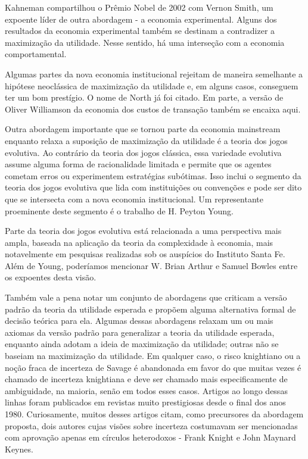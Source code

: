 \documentclass[a4paper,12pt]{article}[abntex2]
\begin{document}
Kahneman compartilhou o Prêmio Nobel de 2002 com Vernon Smith, um expoente líder de outra abordagem - a economia experimental. Alguns dos resultados da economia experimental também se destinam a contradizer a maximização da utilidade. Nesse sentido, há uma interseção com a economia comportamental.

Algumas partes da nova economia institucional rejeitam de maneira semelhante a hipótese neoclássica de maximização da utilidade e, em alguns casos, conseguem ter um bom prestígio. O nome de North já foi citado. Em parte, a versão de Oliver Williamson da economia dos custos de transação também se encaixa aqui.

Outra abordagem importante que se tornou parte da economia mainstream enquanto relaxa a suposição de maximização da utilidade é a teoria dos jogos evolutiva. Ao contrário da teoria dos jogos clássica, essa variedade evolutiva assume alguma forma de racionalidade limitada e permite que os agentes cometam erros ou experimentem estratégias subótimas. Isso inclui o segmento da teoria dos jogos evolutiva que lida com instituições ou convenções e pode ser dito que se intersecta com a nova economia institucional. Um representante proeminente deste segmento é o trabalho de H. Peyton Young.

Parte da teoria dos jogos evolutiva está relacionada a uma perspectiva mais ampla, baseada na aplicação da teoria da complexidade à economia, mais notavelmente em pesquisas realizadas sob os auspícios do Instituto Santa Fe. Além de Young, poderíamos mencionar W. Brian Arthur e Samuel Bowles entre os expoentes desta visão.

Também vale a pena notar um conjunto de abordagens que criticam a versão padrão da teoria da utilidade esperada e propõem alguma alternativa formal de decisão teórica para ela. Algumas dessas abordagens relaxam um ou mais axiomas da versão padrão para generalizar a teoria da utilidade esperada, enquanto ainda adotam a ideia de maximização da utilidade; outras não se baseiam na maximização da utilidade. Em qualquer caso, o risco knightiano ou a noção fraca de incerteza de Savage é abandonada em favor do que muitas vezes é chamado de incerteza knightiana e deve ser chamado mais especificamente de ambiguidade, na maioria, senão em todos esses casos. Artigos ao longo dessas linhas foram publicados em revistas muito prestigiosas desde o final dos anos 1980. Curiosamente, muitos desses artigos citam, como precursores da abordagem proposta, dois autores cujas visões sobre incerteza costumavam ser mencionadas com aprovação apenas em círculos heterodoxos - Frank Knight e John Maynard Keynes.
\end{document}
